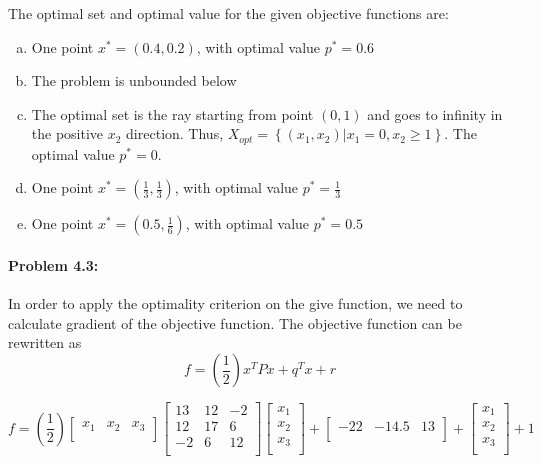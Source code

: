 \documentclass[12pt] {article}
\begin{document}
The optimal set and optimal value for the given objective functions are:
\begin{enumerate} [(a)]
\item One point $x^{*}=(0.4,0.2)$, with optimal value $p^{*} = 0.6$
\item The problem is unbounded below
\item The optimal set is the ray starting from point $(0,1)$ and goes to infinity in the positive $x_2$ direction. Thus, $X_{opt}= \left\lbrace(x_{1},x_{2})| x_{1} = 0, x_{2}\geq 1 \right\rbrace$. The optimal value $p^{*}=0$. 
\item One point $x^{*}=(\frac{1}{3},\frac{1}{3})$, with optimal value $p^{*} = \frac{1}{3}$
\item One point $x^{*}=(0.5,\frac{1}{6})$, with optimal value $p^{*} = 0.5$
\end{enumerate}

\paragraph{Problem 4.3:} 
In order to apply the optimality criterion on the give function, we need to calculate gradient of the objective function. The objective function can be rewritten as 
\[
f = (\frac{1}{2})x^{T}Px + q^{T}x + r
\]

\[
f =
(\frac{1}{2}) 
\left[
\begin{array}{ccc}
x_1  & x_2 & x_3\\
\end{array} 
\right]
\left[
\begin{array}{ccc}
13  & 12 & -2\\
12  & 17 & 6\\
-2  & 6 & 12\\
\end{array} 
\right]
\left[
\begin{array}{c}
x_1  \\
x_2  \\
x_3\\
\end{array} 
\right]
 + 
\left[
\begin{array}{ccc}
-22  & -14.5 & 13\\
\end{array} 
\right]
+
\left[
\begin{array}{c}
x_1  \\
x_2  \\
x_3\\
\end{array} 
\right]
+1
\] 
\end{document}
